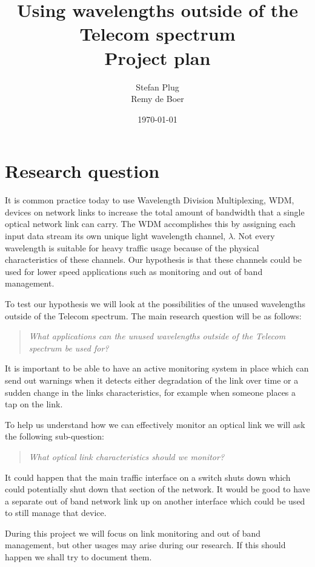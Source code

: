 \documentclass{article}
\begin{document}
\title{Using wavelengths outside of the Telecom spectrum\\Project plan}
\author{Stefan Plug\\Remy de Boer}
\date{\today}
\maketitle

\section{Research question}
It is common practice today to use Wavelength Division Multiplexing, WDM, devices on network links to increase the total amount of bandwidth that a single optical network link can carry. The WDM accomplishes this by assigning each input data stream its own unique light wavelength channel, $\lambda$. 
Not every wavelength is suitable for heavy traffic usage because of the physical characteristics of these channels. Our hypothesis is that these channels could be used for lower speed applications such as monitoring and out of band management.

To test our hypothesis we will look at the possibilities of the unused wavelengths outside of the Telecom spectrum.
The main research question will be as follows:
\begin{quote}
\textit{
What applications can the unused wavelengths outside of the Telecom spectrum be used for?
}
\end{quote}

It is important to be able to have an active monitoring system in place which can send out warnings when it detects either degradation of the link over time or a sudden change in the links characteristics, for example when someone places a tap on the link. 

To help us understand how we can effectively monitor an optical link we will ask the following sub-question:
\begin{quote}
\textit{
What optical link characteristics should we monitor?
}
\end{quote}

It could happen that the main traffic interface on a switch shuts down which could potentially shut down that section of the network.
It would be good to have a separate out of band network link up on another interface which could be used to still manage that device.

During this project we will focus on link monitoring and out of band management, but other usages may arise during our research.
If this should happen we shall try to document them.
\end{document}
